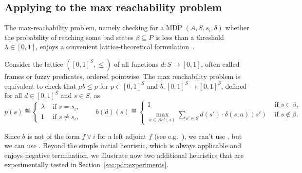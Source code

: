 \subsection{Applying {\ADPDR} to the max reachability problem}
The max-reachability problem, namely checking for a MDP $(A, S, s_\iota, \delta)$ whether the probability of reaching some bad states $\beta\subseteq P$ is less than a threshold $\lambda \in [0, 1]$, enjoys a convenient lattice-theoretical formulation~\cite{BK08}.

Consider the lattice $([0, 1]^S,\leq)$ of all functions $d\colon S\to [0,1]$, often called frames or fuzzy predicates, ordered pointwise. The max reachability problem is equivalent to check that $\mu b \leq p$ for $p\in[0,1]^S$ and $b \colon [0, 1]^S \to [0, 1]^S$, defined for all $d\in [0, 1]^S $ and $s\in S$, as
\begin{displaymath}
	p(s) \eqdef \begin{cases}
		\lambda & \text{ if } s=s_\iota,       \\
		1       & \text{ if }  s \neq s_\iota,
	\end{cases}
	\qquad
	b(d)(s) \eqdef \begin{cases}
		1                                                                                      & \text{ if } s \in \beta,     \\
		\displaystyle \max_{a \in \mathit{Act}(s)} \sum_{s'\in S} d(s') \cdot \delta(s, a)(s') & \text{ if } s \notin \beta .
	\end{cases}
\end{displaymath}

Since $b$ is not of the form $f\lor i$ for a left adjoint $f$ (see e.g.~\cite{KUKSH22}), we can't use {\APDR}, but we can use {\ADPDR}.
Beyond the simple initial heuristic, which is always applicable and enjoys negative termination, we illustrate now two additional heuristics that are experimentally tested in Section~\ref{sec:pdr:experiments}.

